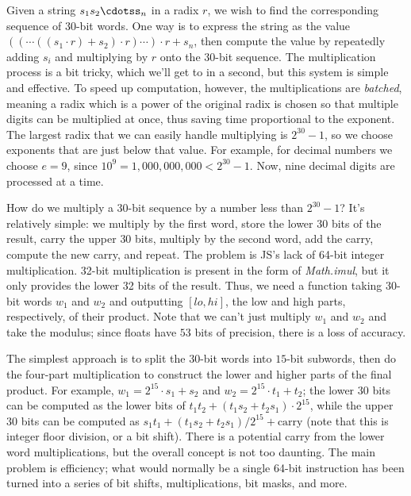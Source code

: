 \documentclass{article}
\begin{document}
Given a string $s_1s_2\cdotss_n$ in a radix $r$, we wish to find the corresponding sequence of $30$-bit words. One way is to express the string as the value $((\cdots((s_1\cdot r)+s_2)\cdot r)\cdots)\cdot r +s_n$, then compute the value by repeatedly adding $s_i$ and multiplying by $r$ onto the $30$-bit sequence. The multiplication process is a bit tricky, which we'll get to in a second, but this system is simple and effective. To speed up computation, however, the multiplications are \textit{batched}, meaning a radix which is a power of the original radix is chosen so that multiple digits can be multiplied at once, thus saving time proportional to the exponent. The largest radix that we can easily handle multiplying is $2^30-1$, so we choose exponents that are just below that value. For example, for decimal numbers we choose $e=9$, since $10^9=1,000,000,000<2^30-1$. Now, nine decimal digits are processed at a time.

How do we multiply a 30-bit sequence by a number less than $2^30-1$? It's relatively simple: we multiply by the first word, store the lower $30$ bits of the result, carry the upper $30$ bits, multiply by the second word, add the carry, compute the new carry, and repeat. The problem is JS's lack of 64-bit integer multiplication. 32-bit multiplication is present in the form of \textit{Math.imul}, but it only provides the lower 32 bits of the result. Thus, we need a function taking 30-bit words $w_1$ and $w_2$ and outputting $[lo, hi]$, the low and high parts, respectively, of their product. Note that we can't just multiply $w_1$ and $w_2$ and take the modulus; since floats have $53$ bits of precision, there is a loss of accuracy.

The simplest approach is to split the $30$-bit words into $15$-bit subwords, then do the four-part multiplication to construct the lower and higher parts of the final product. For example, $w_1=2^{15}\cdot s_1+s_2$ and $w_2=2^{15}\cdot t_1+t_2$; the lower $30$ bits can be computed as the lower bits of $t_1t_2+(t_1s_2+t_2s_1)\cdot 2^{15}$, while the upper $30$ bits can be computed as $s_1t_1+(t_1s_2+t_2s_1)/2^{15}+\text{carry}$ (note that this is integer floor division, or a bit shift). There is a potential carry from the lower word multiplications, but the overall concept is not too daunting. The main problem is efficiency; what would normally be a single 64-bit instruction has been turned into a series of bit shifts, multiplications, bit masks, and more.
\end{document}
